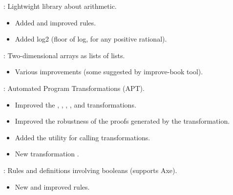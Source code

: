 \begin{frame}

\implibtitle

:
Lightwight library about arithmetic.
\begin{itemize}
\item Added and improved rules.
\item Added log2 (floor of log, for any positive rational).
\end{itemize}

\end{frame}


\begin{frame}

\implibtitle

:
Two-dimensional arrays as lists of lists.
\begin{itemize}
\item Various improvements (some suggested by improve-book tool).
\end{itemize}

\end{frame}


\begin{frame}

\implibtitle

:
Automated Program Transformations (APT).
\begin{itemize}
\item Improved the , ,
  , , and
   transformations.
\item Improved the robustness of the proofs
  generated by the  transformation.
\item Added the  utility for calling transformations.
\item New transformation .
\end{itemize}

\end{frame}


\begin{frame}

\implibtitle

:
Rules and definitions involving booleans (supports Axe).
\begin{itemize}
\item New and improved rules.
\end{itemize}

\end{frame}

